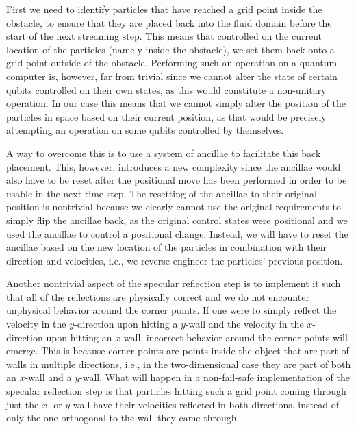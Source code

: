 First we need to identify particles that have reached a grid point inside the obstacle, to ensure that they are placed back into the fluid domain before the start of the next streaming step.
This means that controlled on the current location of the particles (namely inside the obstacle), we set them back onto a grid point outside of the obstacle. Performing such an operation on a quantum computer is, however, far from trivial since we cannot alter the state of certain qubits controlled on their own states, as this would constitute a non-unitary operation. 
In our case this means that we cannot simply alter the position of the particles in space based on their current position, as that would be precisely attempting an operation on some qubits controlled by themselves. 

A way to overcome this is to use a system of ancillae to facilitate this back placement. This, however, introduces a new complexity since the ancillae would also have to be reset after the positional move has been performed in order to be usable in the next time step.
The resetting of the ancillae to their original position is nontrivial because we clearly cannot use the original requirements to simply flip the ancillae back, as the original control states were positional and we used the ancillae to control a positional change. Instead, we will have to reset the ancillae based on the new location of the particles in combination with their direction and velocities, i.e., we reverse engineer the particles' previous position. 

Another nontrivial aspect of the specular reflection step is to implement it such that all of the reflections are physically correct and we do not encounter unphysical behavior around the corner points. 
If one were to simply reflect the velocity in the $y$-direction upon hitting a $y$-wall and the velocity in the $x$-direction upon hitting an $x$-wall, incorrect behavior around the corner points will emerge. This is because corner points are points inside the object that are part of walls in multiple directions, i.e., in the two-dimensional case they are part of both an $x$-wall and a $y$-wall. 
What will happen in a non-fail-safe implementation of the specular reflection step is that particles hitting such a grid point coming through just the $x$- or $y$-wall have their velocities reflected in both directions, instead of only the one orthogonal to the wall they came through. 

